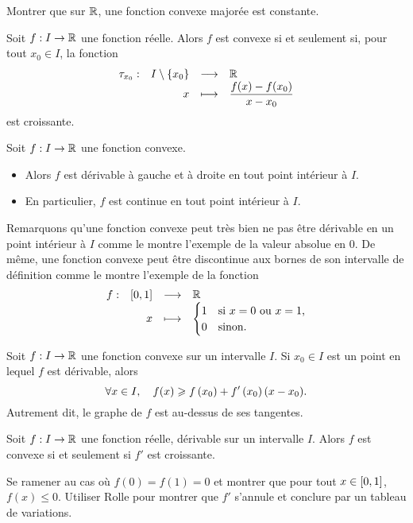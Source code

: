 \documentclass{magnoliaold}
\begin{document}
\begin{exos}
\exo Montrer que sur $\mathbb{R}$, une fonction convexe majorée est constante.
\end{exos}
  


\begin{proposition}
Soit $f:I\to\mathbb{R}$ une fonction réelle. Alors $f$ est convexe si et seulement si, pour
tout $x_0\in I$, la fonction
\[\begin{array}[t]{lrcl} \displaystyle{\tau_{x_0}} : & \displaystyle{I\setminus\left\{x_0\right\}} & \longrightarrow & \displaystyle{\mathbb{R}} \\ & \displaystyle{x} & \longmapsto & \displaystyle{\frac{f(x)-f(x_0)}{x-x_0}} \end{array}\]
est croissante.
\end{proposition}




\begin{proposition}
Soit $f:I\to\mathbb{R}$ une fonction convexe.
\begin{itemize}
\item Alors $f$ est dérivable à gauche et à droite en tout point intérieur à $I$.
\item En particulier, $f$ est continue en tout point intérieur à $I$.
\end{itemize}
\end{proposition}

\begin{remarqueUnique}
  \remarque 
  Remarquons qu'une fonction convexe peut
  très bien ne pas être dérivable en un point intérieur à $I$ comme le montre
  l'exemple de la valeur absolue en 0. De même, une fonction convexe peut
  être discontinue aux bornes de son intervalle de définition comme le
  montre l'exemple de la fonction
  \[\begin{array}[t]{lrcl} \displaystyle{f} : & \displaystyle{\left[0,1\right]} & \longrightarrow & \displaystyle{\mathbb{R}} \\ & \displaystyle{x} & \longmapsto & \displaystyle{
    \begin{cases}
    1 & \text{si $x=0$ ou $x=1$,}\\
    0 & \text{sinon.}  
    \end{cases}} \end{array}\]
\end{remarqueUnique}

\begin{proposition}[utile=-3]
Soit $f:I\to\mathbb{R}$ une fonction convexe sur un intervalle $I$. Si $x_0\in I$ est un point
en lequel $f$ est dérivable, alors
\[\forall x\in I,\quad f(x)\geqslant f\left(x_0\right)+f'\left(x_0\right)(x-x_0).\]
Autrement dit, le graphe de $f$ est au-dessus de ses tangentes.
\end{proposition}



\begin{proposition}[utile=-3]
Soit $f:I\to\mathbb{R}$ une fonction réelle, dérivable sur un intervalle $I$. Alors
$f$ est convexe si et seulement si $f'$ est croissante.
\end{proposition}
\begin{preuve}
Se ramener au cas où $f(0)=f(1)=0$ et montrer que pour tout
$x\in\left[0,1\right]$, $f(x)\leq 0$. Utiliser Rolle pour montrer que $f'$ s'annule
et conclure par un tableau de variations.
\end{preuve}
\end{document}
